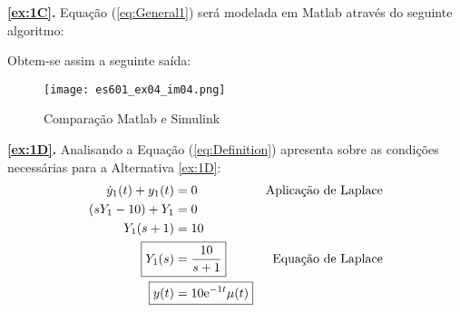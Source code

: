\documentclass{article}
\begin{document}
\newpage
            \begin{resolution}
                \textbf{\ref{ex:1C}.} Equação (\ref{eq:General1}) será modelada em Matlab através do seguinte algoritmo:
                    \begin{scriptsize}
                        \myOctave
                        
                    \end{scriptsize}
                Obtem-se assim a seguinte saída:
                    \begin{figure}[H]
                        \centering
                        \texttt{[image: es601\_ex04\_im04.png]}
                        \caption{Comparação Matlab e Simulink}
                    \end{figure}
            \end{resolution}
\newpage
            \begin{resolution}
                \textbf{\ref{ex:1D}.} Analisando a Equação (\ref{eq:Definition}) apresenta sobre as condições necessárias para a Alternativa \ref{ex:1D}:
                    \begin{align}
                        \dot{y}_{1}(t) + y_{1}(t) &= 0 & \text{Aplicação de Laplace}\nonumber\\
                        (sY_{1} - 10) + Y_{1}     &= 0\nonumber\\
                        Y_{1}(s + 1)     &= 10\nonumber\\
                        \Aboxed{Y_{1}(s) &= \frac{10}{s + 1}} & \text{Equação de Laplace}\\
                        \Aboxed{y(t)     &= 10\text{e}^{-1t}\mu(t)}
                    \end{align}
            \end{resolution}
\newpage
\end{document}

